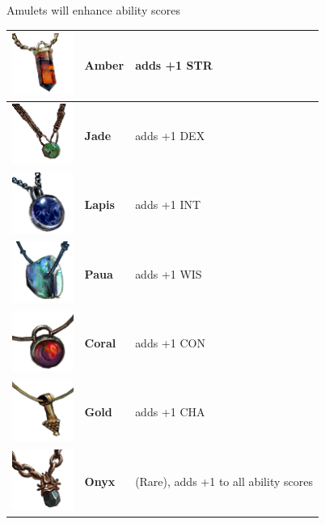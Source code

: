 Amulets will enhance ability scores \\

\begin{tabular}{m{2cm}m{3cm}m{4cm} } \hline
	\includegraphics[width=2cm]{../Pictures/Gameplay/Items/Wearables/Amulets/Amber_amulet_icon.png} & \textbf{Amber} & adds +1 STR \\ \hline
	\includegraphics[width=2cm]{../Pictures/Gameplay/Items/Wearables/Amulets/Jade_amulet_icon.png} & \textbf{Jade} & adds +1 DEX \\ \hline
	\includegraphics[width=2cm]{../Pictures/Gameplay/Items/Wearables/Amulets/Lapis_amulet_icon.png} & \textbf{Lapis} & adds +1 INT \\ \hline
	\includegraphics[width=2cm]{../Pictures/Gameplay/Items/Wearables/Amulets/Paua_amulet_icon.png} & \textbf{Paua} & adds +1 WIS \\ \hline
	\includegraphics[width=2cm]{../Pictures/Gameplay/Items/Wearables/Amulets/Coral_amulet_icon.png} & \textbf{Coral} & adds +1 CON \\ \hline
	\includegraphics[width=2cm]{../Pictures/Gameplay/Items/Wearables/Amulets/Gold_amulet_icon.png} & \textbf{Gold} & adds +1 CHA \\ \hline
	\includegraphics[width=2cm]{../Pictures/Gameplay/Items/Wearables/Amulets/Onyx_amulet_icon.png} & \textbf{Onyx} & (Rare), adds +1 to all ability scores \\ \hline
\end{tabular}

\clearpage